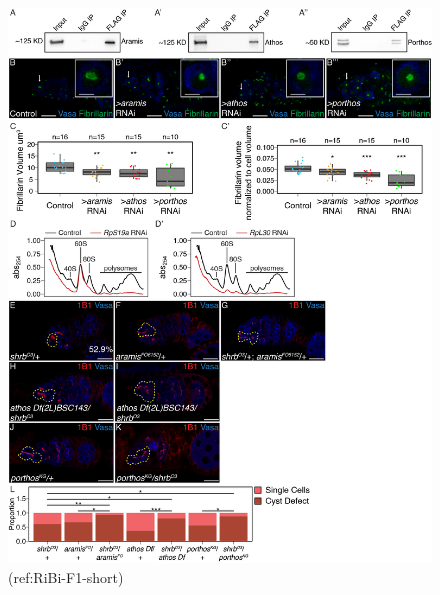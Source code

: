 \documentclass[12pt,oneside]{reedthesis}
\begin{document}
\begin{figure}

{\centering \includegraphics[width=6.5 in,height=8.9375 in]{./figure/Ribosome Biogenesis/Ribosome Biogenesis 2S} 

}

\caption[(ref:RiBi-F1-short)]{(ref:RiBi-F1-short)}\label{fig:unnamed-chunk-9}
\end{figure}
\end{document}
